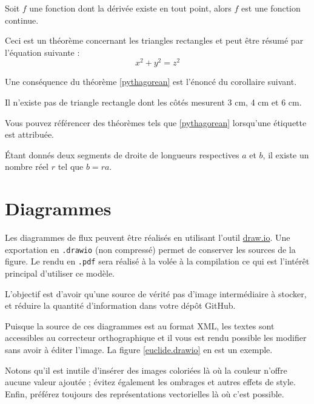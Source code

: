 \begin{theorem}
    Soit $f$ une fonction dont la dérivée existe en tout point, alors $f$ est une fonction continue.
\end{theorem}

\begin{theorem}
    \label{pythagorean}
    Ceci est un théorème concernant les triangles rectangles et peut être résumé par l'équation suivante :
    \[ x^2 + y^2 = z^2 \]
\end{theorem}

Une conséquence du théorème \ref{pythagorean} est l'énoncé du corollaire suivant.

\begin{corollary}
    Il n'existe pas de triangle rectangle dont les côtés mesurent 3 cm, 4 cm et 6 cm.
\end{corollary}

Vous pouvez référencer des théorèmes tels que \ref{pythagorean} lorsqu'une étiquette est attribuée.

\begin{lemma}
    Étant donnés deux segments de droite de longueurs respectives $a$ et $b$, il existe un nombre réel $r$ tel que $b = ra$.
\end{lemma}


\section{Diagrammes}

Les diagrammes de flux peuvent être réalisés en utilisant l'outil \href{https://app.diagrams.net/}{draw.io}. Une exportation en \texttt{.drawio} (non compressé) permet de conserver les sources de la figure. Le rendu en \texttt{.pdf} sera réalisé à la volée à la compilation ce qui est l'intérêt principal d'utiliser ce modèle.

L'objectif est d'avoir qu'une source de vérité \cad pas d'image intermédiaire à stocker, et réduire la quantité d'information dans votre dépôt GitHub.

Puisque la source de ces diagrammes est au format XML, les textes sont accessibles au correcteur orthographique et il vous est rendu possible les modifier sans avoir à éditer l'image. La figure \ref{euclide.drawio} en est un exemple.


Notons qu'il est inutile d'insérer des images coloriées là où la couleur n'offre aucune valeur ajoutée ; évitez également les ombrages et autres effets de style. Enfin, préférez toujours des représentations vectorielles là où c'est possible.

